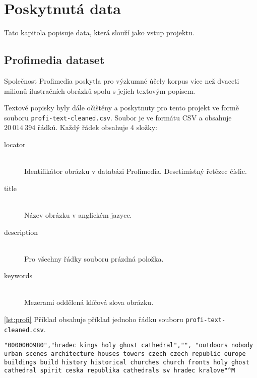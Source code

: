 \chapter{Poskytnutá data}

Tato kapitola popisuje data, která slouží jako vstup projektu.

\section{Profimedia dataset}

Společnost Profimedia poskytla pro výzkumné účely korpus více než dvaceti milionů ilustračních obrázků spolu s jejich textovým popisem.

Textové popisky byly dále očištěny\cite{brno} a poskytnuty pro tento projekt ve formě souboru \lstinline{profi-text-cleaned.csv}. Soubor je ve formátu CSV a obsahuje $20\ 014\ 394$ řádků. Každý řádek obsahuje 4 složky:

\begin{description}

\item[locator] \hfill \\
  Identifikátor obrázku v databázi Profimedia. Desetimístný řetězec číslic.

\item[title] \hfill \\
  Název obrázku v anglickém jazyce.

\item[description] \hfill \\
  Pro všechny řádky souboru prázdná položka.

\item[keywords] \hfill \\
  Mezerami oddělená klíčová slova obrázku.

\end{description}

\autoref{lst:profi} Příklad obsahuje příklad jednoho řádku souboru \lstinline{profi-text-cleaned.csv}.

\begin{lstlisting}[caption={Řádek souboru profi-text-cleaned.csv},label={lst:profi}]
"0000000980","hradec kings holy ghost cathedral","", "outdoors nobody urban scenes architecture houses towers czech czech republic europe buildings build history historical churches church fronts holy ghost cathedral spirit ceska republika cathedrals sv hradec kralove"^M
\end{lstlisting}

